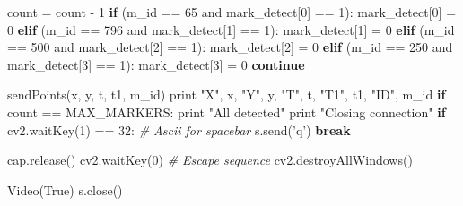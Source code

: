 \documentclass[]{article}
\newenvironment{Shaded}{}{}
\newcommand{\DecValTok}[1]{\textcolor[rgb]{0.25,0.63,0.44}{{#1}}}
\newcommand{\StringTok}[1]{\textcolor[rgb]{0.25,0.44,0.63}{{#1}}}
\newcommand{\CommentTok}[1]{\textcolor[rgb]{0.38,0.63,0.69}{\textit{{#1}}}}
\newcommand{\VariableTok}[1]{\textcolor[rgb]{0.10,0.09,0.49}{{#1}}}
\newcommand{\ControlFlowTok}[1]{\textcolor[rgb]{0.00,0.44,0.13}{\textbf{{#1}}}}
\newcommand{\OperatorTok}[1]{\textcolor[rgb]{0.40,0.40,0.40}{{#1}}}
\newcommand{\BuiltInTok}[1]{{#1}}
\newcommand{\NormalTok}[1]{{#1}}
\begin{document}
\begin{Shaded}
\begin{Highlighting}[]
                \NormalTok{count }\OperatorTok{=} \NormalTok{count }\OperatorTok{-} \DecValTok{1}
                \ControlFlowTok{if} \NormalTok{(m_id }\OperatorTok{==} \DecValTok{65} \OperatorTok{and} \NormalTok{mark_detect[}\DecValTok{0}\NormalTok{] }\OperatorTok{==} \DecValTok{1}\NormalTok{):}
                    \NormalTok{mark_detect[}\DecValTok{0}\NormalTok{] }\OperatorTok{=} \DecValTok{0}
                \ControlFlowTok{elif} \NormalTok{(m_id }\OperatorTok{==} \DecValTok{796} \OperatorTok{and} \NormalTok{mark_detect[}\DecValTok{1}\NormalTok{] }\OperatorTok{==} \DecValTok{1}\NormalTok{):}
                    \NormalTok{mark_detect[}\DecValTok{1}\NormalTok{] }\OperatorTok{=} \DecValTok{0}
                \ControlFlowTok{elif} \NormalTok{(m_id }\OperatorTok{==} \DecValTok{500} \OperatorTok{and} \NormalTok{mark_detect[}\DecValTok{2}\NormalTok{] }\OperatorTok{==} \DecValTok{1}\NormalTok{):}
                    \NormalTok{mark_detect[}\DecValTok{2}\NormalTok{] }\OperatorTok{=} \DecValTok{0}
                \ControlFlowTok{elif} \NormalTok{(m_id }\OperatorTok{==} \DecValTok{250} \OperatorTok{and} \NormalTok{mark_detect[}\DecValTok{3}\NormalTok{] }\OperatorTok{==} \DecValTok{1}\NormalTok{):}
                    \NormalTok{mark_detect[}\DecValTok{3}\NormalTok{] }\OperatorTok{=} \DecValTok{0}
                \ControlFlowTok{continue}
                
            \NormalTok{sendPoints(x, y, t, t1, m_id)}
            \BuiltInTok{print} \StringTok{"X"}\NormalTok{, x, }\StringTok{"Y"}\NormalTok{, y, }\StringTok{"T"}\NormalTok{, t, }\StringTok{"T1"}\NormalTok{, t1,  }\StringTok{"ID"}\NormalTok{, m_id}
            \ControlFlowTok{if} \NormalTok{count }\OperatorTok{==} \NormalTok{MAX_MARKERS:}
                \BuiltInTok{print} \StringTok{"All detected"}
                \BuiltInTok{print} \StringTok{"Closing connection"}
                \ControlFlowTok{if} \NormalTok{cv2.waitKey(}\DecValTok{1}\NormalTok{) }\OperatorTok{==} \DecValTok{32}\NormalTok{: }\CommentTok{# Ascii for spacebar}
                    \NormalTok{s.send(}\StringTok{'q'}\NormalTok{)}
                \ControlFlowTok{break}
                        
                    
            

    \NormalTok{cap.release()}
    \NormalTok{cv2.waitKey(}\DecValTok{0}\NormalTok{)     }\CommentTok{# Escape sequence}
    \NormalTok{cv2.destroyAllWindows()}

\NormalTok{Video(}\VariableTok{True}\NormalTok{)}
\NormalTok{s.close()}
\end{Highlighting}
\end{Shaded}
\end{document}
